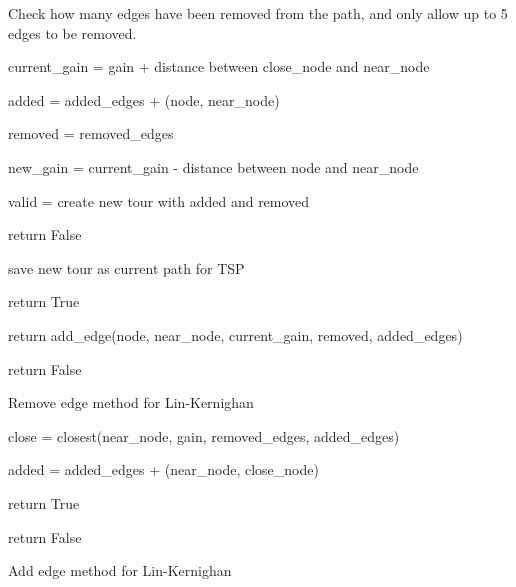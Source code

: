 \documentclass{article}
\begin{document}
\begin{algorithm}

  Check how many edges have been removed from the path, and only allow up to 5 edges to be removed.

  {
    current\_gain = gain + distance between close\_node and near\_node
    {
      added = added\_edges + (node, near\_node)

      removed = removed\_edges

      new\_gain = current\_gain - distance between node and near\_node

      valid = create new tour with added and removed
      {
        {
          return False
        }

        {
          save new tour as current path for TSP

          return True
        }
        {
          return add\_edge(node, near\_node, current\_gain, removed, added\_edges)
        }
      }
    }

  }
  return False

  \caption{Remove edge method for Lin-Kernighan}
\end{algorithm}


\begin{algorithm}
  
  close = closest(near\_node, gain, removed\_edges, added\_edges)

  {
    added = added\_edges + (near\_node, close\_node)

    {
      return True
    }
  }
  return False

  \caption{Add edge method for Lin-Kernighan}
\end{algorithm}
\end{document}
